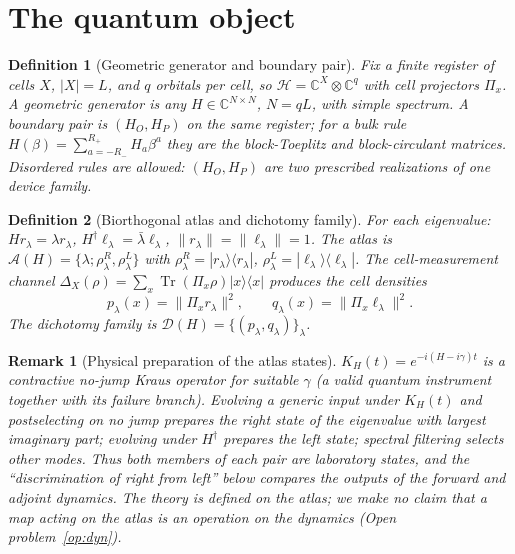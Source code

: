 \documentclass[11pt]{article}
\newtheorem{definition}{Definition}
\newtheorem{remark}{Remark}
\newcommand{\Tr}{\operatorname{Tr}}
\begin{document}
\section{The quantum object}
\begin{definition}[Geometric generator and boundary pair]
Fix a finite register of cells $X$, $|X|=L$, and $q$ orbitals per cell, so $\mathcal H=\mathbb C^X\otimes\mathbb C^q$ with cell projectors $\Pi_x$.
A \emph{geometric generator} is any $H\in\mathbb C^{N\times N}$, $N=qL$, with simple spectrum. A \emph{boundary pair} is $(H_O,H_P)$ on the same register;
for a bulk rule $H(\beta)=\sum_{a=-R_-}^{R_+}H_a\beta^a$ they are the block-Toeplitz and block-circulant matrices. Disordered rules are allowed: $(H_O,H_P)$ are two prescribed realizations of one device family.
\end{definition}

\begin{definition}[Biorthogonal atlas and dichotomy family]
For each eigenvalue: $Hr_\lambda=\lambda r_\lambda$, $H^\dagger\ell_\lambda=\bar\lambda\ell_\lambda$, $\|r_\lambda\|=\|\ell_\lambda\|=1$.
The atlas is $\mathcal A(H)=\{\lambda;\rho^R_\lambda,\rho^L_\lambda\}$ with $\rho^R_\lambda=|r_\lambda\rangle\langle r_\lambda|$, $\rho^L_\lambda=|\ell_\lambda\rangle\langle\ell_\lambda|$.
The \emph{cell-measurement channel} $\Delta_X(\rho)=\sum_x\Tr(\Pi_x\rho)|x\rangle\langle x|$ produces the cell densities
\[
p_\lambda(x)=\|\Pi_xr_\lambda\|^2,\qquad q_\lambda(x)=\|\Pi_x\ell_\lambda\|^2 .
\]
The \emph{dichotomy family} is $\mathcal D(H)=\{(p_\lambda,q_\lambda)\}_\lambda$.
\end{definition}

\begin{remark}[Physical preparation of the atlas states]
$K_H(t)=e^{-i(H-i\gamma)t}$ is a contractive no-jump Kraus operator for suitable $\gamma$ (a valid quantum instrument together with its failure branch).
Evolving a generic input under $K_H(t)$ and postselecting on no jump prepares the right state of the eigenvalue with largest imaginary part; evolving under $H^\dagger$ prepares the left state;
spectral filtering selects other modes. Thus both members of each pair are laboratory states, and the ``discrimination of right from left'' below compares the outputs of the forward and adjoint dynamics.
The theory is defined on the atlas; we make no claim that a map acting on the atlas is an operation on the dynamics (Open problem~\ref{op:dyn}).
\end{remark}

\end{document}
